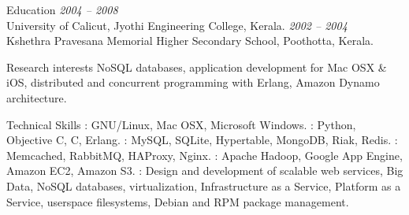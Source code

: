 \documentclass{resume}
\author{Sreejith Kesavan}
\begin{document}
\maketitle


\begin{category}{Education}
   \hfill {\em 2004 -- 2008}\\
  University of Calicut, Jyothi Engineering College, Kerala.
   \hfill {\em 2002 -- 2004}\\
  Kshethra Pravesana Memorial Higher Secondary School, Poothotta, Kerala.
\end{category}


\begin{category}{Research interests}
  \citemnobullet NoSQL databases, application development for Mac OSX \& iOS, 
  distributed and concurrent programming with Erlang, Amazon Dynamo architecture.
\end{category}

\begin{category}{Technical Skills}
  : GNU/Linux, Mac OSX, Microsoft Windows.
  : Python, Objective C, C, Erlang.
  : MySQL, SQLite, Hypertable, MongoDB, Riak, Redis.
  : Memcached, RabbitMQ, HAProxy, Nginx.
  : Apache Hadoop, Google App Engine, Amazon EC2, Amazon S3.
  : Design and development of scalable web services, Big Data, 
  NoSQL databases, virtualization, Infrastructure as a Service, Platform as a Service, 
  userspace filesystems, Debian and RPM package management.
\end{category}

\end{document}
